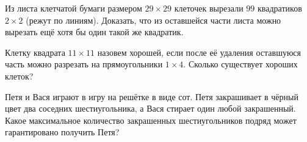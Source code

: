 \begin{problem}
	Из листа клетчатой бумаги размером $29 \times 29$ клеточек вырезали $99$ квадратиков $2 \times 2$ (режут по линиям). Доказать, что из оставшейся части листа можно вырезать ещё хотя бы один такой же квадратик.
\end{problem}

\begin{problem}
	Клетку квадрата $11 \times 11$ назовем хорошей, если после её удаления оставшуюся часть можно разрезать на прямоугольники $1 \times 4$. Сколько существует хороших клеток?
\end{problem}

\begin{problem}
	Петя и Вася играют в игру на решётке в виде сот. Петя закрашивает в чёрный цвет два соседних шестиугольника, а Вася стирает один любой закрашенный. Какое максимальное количество закрашенных шестиугольников подряд может гарантировано получить Петя?
\end{problem}

